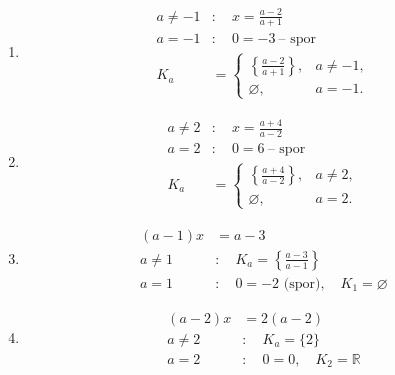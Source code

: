 \documentclass[11pt,a4paper]{article}
\begin{document}
\begin{zadaniReseniBox}[title={Domácí úkol}]
\begin{enumerate}[label=\alph*),itemsep=1pt]
\[\begin{aligned}
\end{aligned}\]
\item
\[\begin{aligned}
a\ne-1&:\quad x=\frac{a-2}{a+1} \\
a=-1&:\quad0=-3\ \text{-- spor} \\
K_a&=\begin{cases}\left\{\frac{a-2}{a+1}\right\},&a\ne-1,\\\varnothing,&a=-1.\end{cases}
\end{aligned}\]
\item
\[\begin{aligned}
a\ne2&:\quad x=\frac{a+4}{a-2} \\
a=2&:\quad0=6\ \text{-- spor} \\
K_a&=\begin{cases}\left\{\frac{a+4}{a-2}\right\},&a\ne2,\\\varnothing,&a=2.\end{cases}
\end{aligned}\]
\item
\[\begin{aligned}(a-1)x&=a-3\\a\ne1&:\quad K_a=\left\{\frac{a-3}{a-1}\right\}\\a=1&:\quad 0=-2\text{ (spor)},\quad K_1=\varnothing\end{aligned}\]
\item
\[\begin{aligned}(a-2)x&=2(a-2)\\a\ne2&:\quad K_a=\{2\}\\a=2&:\quad 0=0,\quad K_2=\mathbb R\end{aligned}\]
\end{enumerate}
\end{zadaniReseniBox}
\end{document}

